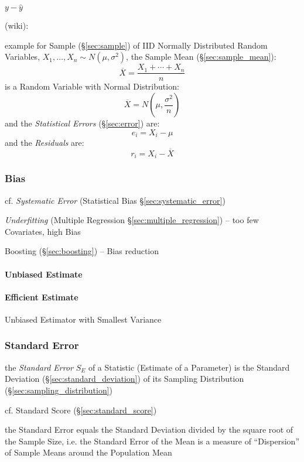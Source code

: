 $y - \hat{y}$

(wiki):

example for Sample (\S\ref{sec:sample}) of IID Normally Distributed Random
Variables, $X_1, \ldots, X_n \sim N(\mu, \sigma^2)$, the Sample Mean
(\S\ref{sec:sample_mean}):
\[
  \overline{X} = \frac{X_1 + \cdots + X_n}{n}
\]
is a Random Variable with Normal Distribution:
\[
  \overline{X} = N(\mu, \frac{\sigma^2}{n})
\]
and the \emph{Statistical Errors} (\S\ref{sec:error}) are:
\[
  e_i = X_i - \mu
\]
and the \emph{Residuals} are:
\[
  r_i = X_i - \overline{X}
\]



\subsubsection{Bias}\label{sec:bias}

cf. \emph{Systematic Error} (Statistical Bias \S\ref{sec:systematic_error})

\emph{Underfitting} (Multiple Regression \S\ref{sec:multiple_regression}) -- too
few Covariates, high Bias

Boosting (\S\ref{sec:boosting}) -- Bias reduction



\paragraph{Unbiased Estimate}\label{sec:unbiased_estimate}\hfill

\paragraph{Efficient Estimate}\label{sec:efficient_estimate}\hfill

Unbiased Estimator with Smallest Variance



\subsubsection{Standard Error}\label{sec:standard_error}

the \emph{Standard Error} $S_E$ of a Statistic (Estimate of a Parameter) is the
Standard Deviation (\S\ref{sec:standard_deviation}) of its Sampling Distribution
(\S\ref{sec:sampling_distribution})

cf. Standard Score (\S\ref{sec:standard_score})

the Standard Error equals the Standard Deviation divided by the square root of
the Sample Size, i.e. the Standard Error of the Mean is a measure of
``Dispersion'' of Sample Means around the Population Mean

